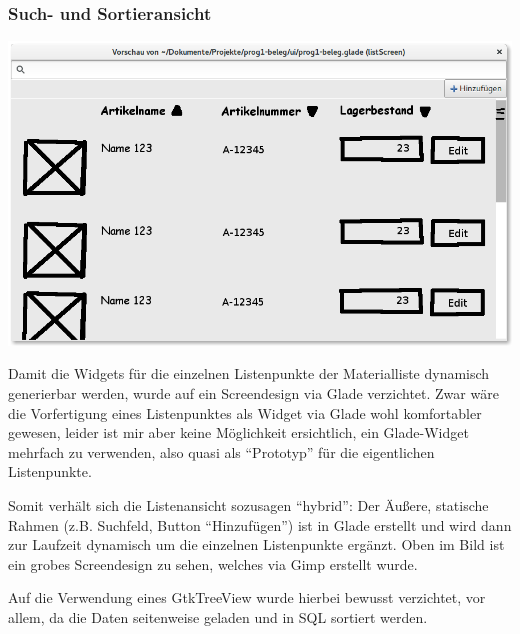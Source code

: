 \subsubsection{Such- und Sortieransicht}
\begin{center}
\noindent\includegraphics[width=150mm,keepaspectratio]{images/06-listenansicht.png}
\end{center}

Damit die Widgets für die einzelnen Listenpunkte der Materialliste dynamisch generierbar werden, wurde auf ein
Screendesign via Glade verzichtet. Zwar wäre die Vorfertigung eines Listenpunktes als Widget via Glade wohl komfortabler
gewesen, leider ist mir aber keine Möglichkeit ersichtlich, ein Glade-Widget mehrfach zu verwenden, also quasi als
``Prototyp'' für die eigentlichen Listenpunkte.

Somit verhält sich die Listenansicht sozusagen ``hybrid'': Der Äußere, statische Rahmen (z.B. Suchfeld, Button ``Hinzufügen'')
ist in Glade erstellt und wird dann zur Laufzeit dynamisch um die einzelnen Listenpunkte ergänzt.
Oben im Bild ist ein grobes Screendesign zu sehen, welches via Gimp erstellt wurde.

Auf die Verwendung eines GtkTreeView wurde hierbei bewusst verzichtet, vor allem, da die Daten seitenweise geladen
und in SQL sortiert werden.

